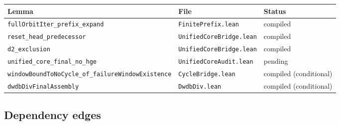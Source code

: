 \begin{center}
\scriptsize
\begin{tabular}{@{}p{}p{}p{}@{}}
\toprule
Lemma & File & Status \\
\midrule
\texttt{fullOrbitIter\_prefix\_expand} &
\texttt{FinitePrefix.lean} & compiled \\
\texttt{reset\_head\_predecessor} &
\texttt{UnifiedCoreBridge.lean} & compiled \\
\texttt{d2\_exclusion} &
\texttt{UnifiedCoreBridge.lean} & compiled \\
\texttt{unified\_core\_final\_no\_hge} &
\texttt{UnifiedCoreAudit.lean} & pending \\
\texttt{windowBoundToNoCycle\_of\_failureWindowExistence} &
\texttt{CycleBridge.lean} & compiled (conditional) \\
\texttt{dwdbDivFinalAssembly} &
\texttt{DwdbDiv.lean} & compiled (conditional) \\
\bottomrule
\end{tabular}
\end{center}

\subsection{Dependency edges}

